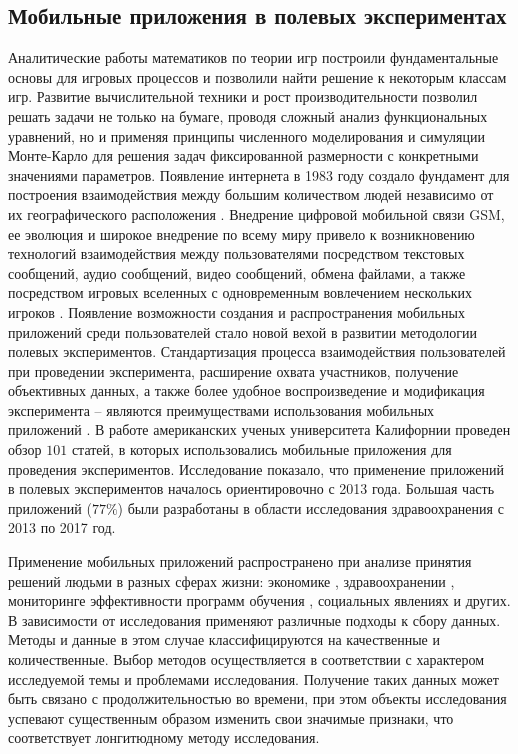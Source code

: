 \subsection{Мобильные приложения в полевых экспериментах}\label{subsec:ch1/sec3/sub3}

Аналитические работы математиков по теории игр построили фундаментальные основы для игровых процессов и позволили найти решение к некоторым классам игр.
Развитие вычислительной техники и рост производительности позволил решать задачи не только на бумаге, проводя сложный анализ функциональных уравнений,
но и применяя принципы численного моделирования и симуляции Монте-Карло \cite{Sobol_monte-carlo_1968} для решения задач фиксированной размерности с конкретными значениями параметров.
Появление интернета в 1983 году создало фундамент для построения взаимодействия между большим количеством людей независимо от их географического расположения \cite{Barbruk_internet_2015}.
Внедрение цифровой мобильной связи GSM, ее эволюция и широкое внедрение по всему миру привело к возникновению технологий взаимодействия между пользователями
посредством текстовых сообщений, аудио сообщений, видео сообщений, обмена файлами, а также посредством игровых вселенных с одновременным вовлечением 
нескольких игроков \cite{teslenko_cell_network_2018}. Появление возможности создания и распространения мобильных приложений среди пользователей стало новой вехой в развитии методологии
полевых экспериментов. Стандартизация процесса взаимодействия пользователей при проведении эксперимента, расширение охвата участников, получение 
объективных данных, а также более удобное воспроизведение и модификация эксперимента -- являются преимуществами использования мобильных приложений 
\cite{zhang_advantages_2018}.
В работе американских ученых университета Калифорнии проведен обзор $101$ статей, в которых использовались мобильные приложения для проведения экспериментов.
Исследование показало, что применение приложений в полевых экспериментов началось ориентировочно с 2013 года. Большая часть приложений ($77\%$) были разработаны
в области исследования здравоохранения с 2013 по 2017 год. \cite{zhang_advantages_2018}

Применение мобильных приложений распространено при анализе принятия решений людьми в разных сферах жизни: 
экономике \cite{li_conducting_2021},
здравоохранении \cite{zhang_efficacy_2015, serkh_optimal_2014},
мониторинге эффективности программ обучения \cite{menon_application_2021},
социальных явлениях \cite{chataway_geography_2017} и других.
В зависимости от исследования применяют различные подходы к сбору данных. Методы и данные в этом случае 
классифицируются на качественные и количественные.
Выбор методов осуществляется в соответствии с характером исследуемой темы и проблемами исследования.
Получение таких данных может быть связано с продолжительностью во времени, при этом объекты исследования 
успевают существенным образом изменить свои значимые признаки, что соответствует лонгитюдному методу исследования. 

